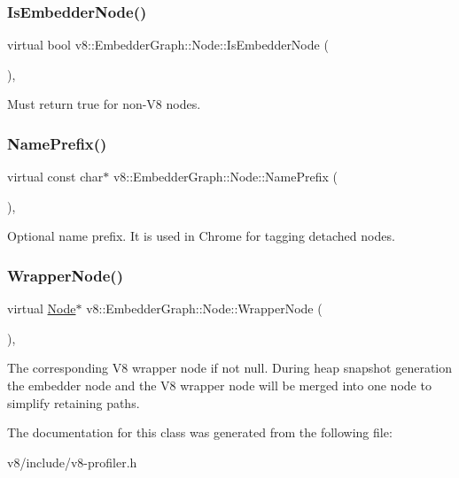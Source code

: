 \subsubsection{\texorpdfstring{Is\+Embedder\+Node()}{IsEmbedderNode()}}
{\footnotesize\ttfamily virtual bool v8\+::\+Embedder\+Graph\+::\+Node\+::\+Is\+Embedder\+Node (\begin{DoxyParamCaption}{ }\end{DoxyParamCaption})\hspace{0.3cm}{\ttfamily [inline]}, {\ttfamily [virtual]}}

Must return true for non-\/\+V8 nodes. \mbox{\label{classv8_1_1EmbedderGraph_1_1Node_a2c4c64b2c3eab48dcdc587aec8734ee8}} 
\subsubsection{\texorpdfstring{Name\+Prefix()}{NamePrefix()}}
{\footnotesize\ttfamily virtual const char$\ast$ v8\+::\+Embedder\+Graph\+::\+Node\+::\+Name\+Prefix (\begin{DoxyParamCaption}{ }\end{DoxyParamCaption})\hspace{0.3cm}{\ttfamily [inline]}, {\ttfamily [virtual]}}

Optional name prefix. It is used in Chrome for tagging detached nodes. \mbox{\label{classv8_1_1EmbedderGraph_1_1Node_acfe58e3b4db90c2ebbfcee5f81415181}} 
\subsubsection{\texorpdfstring{Wrapper\+Node()}{WrapperNode()}}
{\footnotesize\ttfamily virtual \mbox{\hyperlink{classv8_1_1EmbedderGraph_1_1Node}{Node}}$\ast$ v8\+::\+Embedder\+Graph\+::\+Node\+::\+Wrapper\+Node (\begin{DoxyParamCaption}{ }\end{DoxyParamCaption})\hspace{0.3cm}{\ttfamily [inline]}, {\ttfamily [virtual]}}

The corresponding V8 wrapper node if not null. During heap snapshot generation the embedder node and the V8 wrapper node will be merged into one node to simplify retaining paths. 

The documentation for this class was generated from the following file\+:\begin{DoxyCompactItemize}
\item 
v8/include/v8-\/profiler.\+h\end{DoxyCompactItemize}
